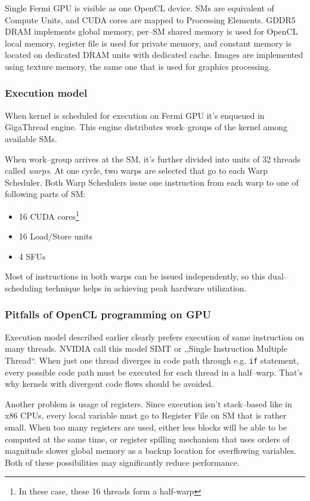 Single Fermi GPU is visible as one OpenCL device. SMs are equivalent of Compute
Units, and CUDA cores are mapped to Processing Elements. GDDR5 DRAM implements
global memory, per--SM shared memory is used for OpenCL local memory,
register file is used for private memory, and constant memory is located on
dedicated DRAM units with dedicated cache. Images are implemented using texture
memory, the same one that is used for graphics processing.

\subsubsection{Execution model}

When kernel is scheduled for execution on Fermi GPU it's enqueued in GigaThread
engine. This engine distributes work--groups of the kernel among available
SMs.

When work--group arrives at the SM, it's further divided into units of 32 threads
called \emph{warps}. At one cycle, two warps are selected that go to each
Warp Scheduler. Both Warp Schedulers issue one instruction from each warp to
one of following parts of SM:
\begin{itemize}
  \item 16 CUDA cores\footnote{In these case, these 16 threads form a half-warp}
  \item 16 Load/Store units
  \item 4 SFUs
\end{itemize}

Most of instructions in both warps can be issued independently, so this
dual--scheduling technique helps in achieving peak hardware utilization.

\subsubsection{Pitfalls of OpenCL programming on GPU}

Execution model described earlier clearly prefers execution of same instruction
on many threads. NVIDIA call this model SIMT or ,,Single Instruction Multiple
Thread``. When just one thread diverges in code path through e.g. \texttt{if}
statement, every possible code path must be executed for each thread in a half--warp.
That's why kernels with divergent code flows should be avoided.

Another problem is usage of registers. Since execution isn't stack--based like
in x86 CPUs, every local variable must go to Register File on SM that is rather
small. When too many registers are used, either less blocks will be able to
be computed at the same time, or register spilling mechanism that uses orders
of magnitude slower global memory as a backup location for overflowing variables.
Both of these possibilities may significantly reduce performance.
